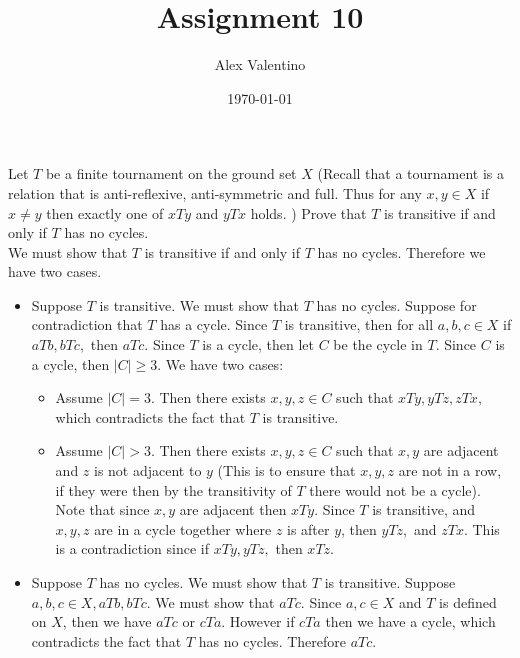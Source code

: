 \documentclass[12pt, letterpaper]{article}
\date{\today}
\author{Alex Valentino}
\title{Assignment 10}
\begin{document}
	Let $T$ be a finite tournament on the ground set $X$ (Recall that a tournament is a relation that is anti-reflexive, anti-symmetric and full. Thus for any $x,y \in X$ if $x \neq y$ then exactly one of $xTy$ and $yTx$ holds.  
)   Prove that $T$ is transitive if and only if $T$ has no cycles.\\

We must show that $T$ is transitive if and only if $T$ has no cycles.  Therefore we have two cases.
\begin{itemize}
	\item Suppose $T$ is transitive.  We must show that $T$ has no cycles. Suppose for contradiction that $T$ has a cycle.   Since $T$ is transitive, then for all $a,b,c \in X$ if $aTb, bTc,$ then $aTc.$  Since $T$ is a cycle, then let $C$ be the cycle in $T$.  Since $C$ is a cycle, then $|C| \geq 3.$  We have two cases:  
	\begin{itemize}
		\item Assume $|C| = 3$.  Then there exists $x,y,z\in C$ such that $xTy, yTz, zTx,$ which contradicts the fact that $T$ is transitive.  
		\item Assume $|C| > 3$.  Then there exists $x,y,z \in C$ such that $x,y$ are adjacent and  $z$ is not adjacent to $y$ (This is to ensure that $x,y,z$ are not in a row, if they were then by the transitivity of $T$ there would not be a cycle).  Note that since $x,y$ are adjacent then $xTy$.  Since $T$ is transitive, and $x,y,z$ are in a cycle together where $z$ is after $y$, then $yTz,$ and $zTx$.  This is a contradiction since if $xTy, yTz,$ then $xTz.$
	\end{itemize}
	\item Suppose $T$ has no cycles. We must show that $T$ is transitive.  Suppose $a,b,c \in X, aTb, bTc.$  We must show that $aTc.$  Since $a,c \in X$ and $T$ is defined on $X$, then we have $aTc$ or $cTa.$  However if $cTa$ then we have a cycle, which contradicts the fact that $T$ has no cycles.  Therefore $aTc$.  
\end{itemize}
\end{document}
